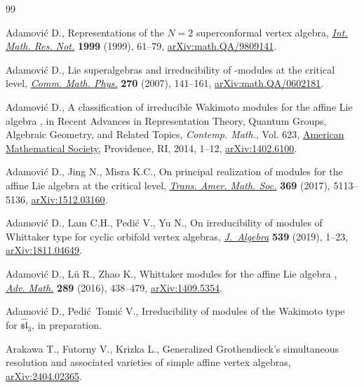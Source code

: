 \documentclass[pdftex]{sigma}
\numberwithin{equation}{section}
\theoremstyle{definition}
\newcommand{\1}{\textbf{1}}
\begin{document}
\begin{thebibliography}{99}
\footnotesize\itemsep=0pt

Adamovi\'c D., Representations of the {$N=2$} superconformal vertex algebra,
 \href{https://doi.org/10.1155/S1073792899000033}{\textit{Int. Math. Res.
 Not.}} \textbf{1999} (1999), 61--79,
 \href{http://arxiv.org/abs/math.QA/9809141}{arXiv:math.QA/9809141}.

Adamovi\'c D., Lie superalgebras and irreducibility of
 -modules at the critical level,
 \href{https://doi.org/10.1007/s00220-006-0153-7}{\textit{Comm. Math. Phys.}}
 \textbf{270} (2007), 141--161,
 \href{http://arxiv.org/abs/math.QA/0602181}{arXiv:math.QA/0602181}.

Adamovi\'c D., A classification of irreducible {W}akimoto modules for the
 affine {L}ie algebra , in Recent Advances in
 Representation Theory, Quantum Groups, Algebraic Geometry, and Related
 Topics, \textit{Contemp. Math.}, Vol. 623,
 \href{https://doi.org/10.1090/conm/623/12454}{American Mathematical Society},
 Providence, RI, 2014, 1--12,
 \href{http://arxiv.org/abs/1402.6100}{arXiv:1402.6100}.

Adamovi\'c D., Jing N., Misra K.C., On principal realization of modules for the
 affine {L}ie algebra  at the critical level,
 \href{https://doi.org/10.1090/tran/7009}{\textit{Trans. Amer. Math. Soc.}}
 \textbf{369} (2017), 5113--5136,
 \href{http://arxiv.org/abs/1512.03160}{arXiv:1512.03160}.

Adamovi\'c D., Lam C.H., Pedi\'c V., Yu N., On irreducibility of modules of
 {W}hittaker type for cyclic orbifold vertex algebras,
 \href{https://doi.org/10.1016/j.jalgebra.2019.08.007}{\textit{J.~Algebra}}
 \textbf{539} (2019), 1--23,
 \href{http://arxiv.org/abs/1811.04649}{arXiv:1811.04649}.

Adamovi\'c D., L\"{u} R., Zhao K., Whittaker modules for the affine {L}ie
 algebra ,
 \href{https://doi.org/10.1016/j.aim.2015.11.020}{\textit{Adv. Math.}}
 \textbf{289} (2016), 438--479,
 \href{http://arxiv.org/abs/1409.5354}{arXiv:1409.5354}.

Adamovi\'c D., Pedi\'c~Tomi\'c V., Irreducibility of modules of the Wakimoto type for $\widehat{\mathfrak{sl}}_3$, {i}n preparation.

Arakawa T., Futorny V., Krizka L., Generalized {G}rothendieck's simultaneous
 resolution and associated varieties of simple affine vertex algebras,
 \href{http://arxiv.org/abs/2404.02365}{arXiv:2404.02365}.


\end{thebibliography}
\end{document}
